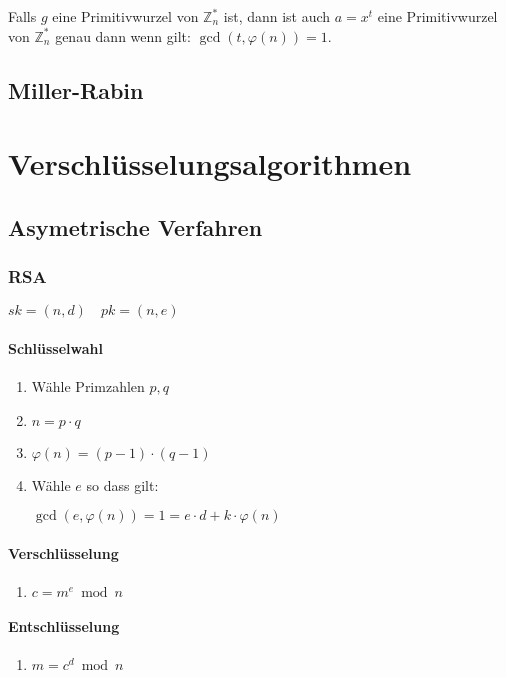 \documentclass[8pt,a4paper,landscape]{article}
\newcommand{\Zx}[1]{\ensuremath{\mathbb{Z}_{#1}^{*}}}
\newcommand{\plaint}{\ensuremath{m}}
\newcommand{\ciphert}{\ensuremath{c}}
\newcommand{\skey}{\ensuremath{sk}}
\newcommand{\pkey}{\ensuremath{pk}}
\begin{document}
\begin{multicols*}{4}
  Falls $g$ eine Primitivwurzel von \Zx{n} ist, dann ist auch $a = x^{t}$ eine Primitivwurzel
  von \Zx{n} genau dann wenn gilt: $\gcd(t,\varphi(n)) = 1$.
    
 \subsection{Miller-Rabin}
 \vspace{2.27cm}
 
 \section{Verschlüsselungsalgorithmen}
 \subsection{Asymetrische Verfahren}
 \subsubsection{RSA}
 $\skey = (n,d) \quad \pkey = (n,e)$
 
 \paragraph{Schlüsselwahl}
 \begin{enumerate}[itemsep=2pt,leftmargin=15pt]
  \item Wähle Primzahlen $p,q$
  \item $n = p \cdot q$
  \item $\varphi(n) = (p-1) \cdot (q-1)$
  \item Wähle $e$ so dass gilt:\par
  $\gcd(e,\varphi(n)) = 1 = e \cdot d + k \cdot \varphi(n)$
 \end{enumerate}
 \paragraph{Verschlüsselung}
 \begin{enumerate}[itemsep=2pt,leftmargin=15pt]
  \item $\ciphert = \plaint^e \bmod n$
 \end{enumerate}
 
 \paragraph{Entschlüsselung}
 \begin{enumerate}[itemsep=2pt,leftmargin=15pt]
  \item $\plaint = \ciphert^d \bmod n$
 \end{enumerate}


\end{multicols*}
\end{document}
